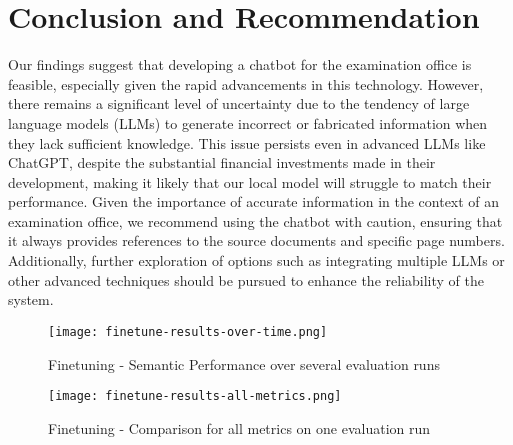 \documentclass[conference]{IEEEtran}
\begin{document}
\section{Conclusion and Recommendation}

Our findings suggest that developing a chatbot for the examination office is feasible, especially given the rapid advancements in this technology. However, there remains a significant level of uncertainty due to the tendency of large language models (LLMs) to generate incorrect or fabricated information when they lack sufficient knowledge. This issue persists even in advanced LLMs like ChatGPT, despite the substantial financial investments made in their development, making it likely that our local model will struggle to match their performance. Given the importance of accurate information in the context of an examination office, we recommend using the chatbot with caution, ensuring that it always provides references to the source documents and specific page numbers. Additionally, further exploration of options such as integrating multiple LLMs or other advanced techniques should be pursued to enhance the reliability of the system.



\newpage





\begin{figure*}[]
    \centering
    \texttt{[image: finetune-results-over-time.png]}
    \caption{Finetuning - Semantic Performance over several evaluation runs}
    \label{fig:FINETUNE_OVER_TIME}
\end{figure*}

\begin{figure*}[]
    \centering
    \texttt{[image: finetune-results-all-metrics.png]}
    \caption{Finetuning - Comparison for all metrics on one evaluation run}
    \label{fig:FINETUNE_ALL_METRICS}
\end{figure*}






\vspace{12pt}
\end{document}

